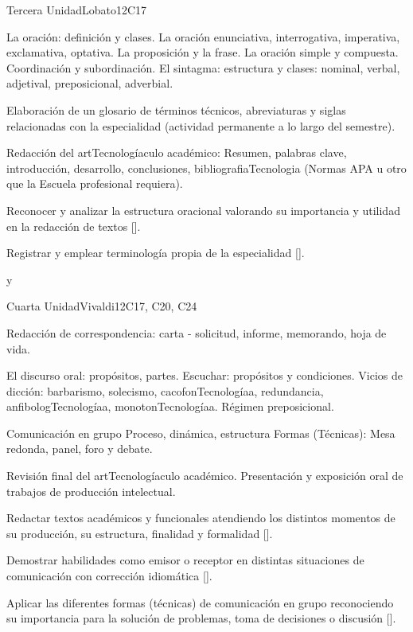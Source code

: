 \begin{syllabus}
\begin{unit}{}{Tercera Unidad}{Lobato}{12}{C17}
\begin{topics}
   \item La oración: definición y clases. La oración enunciativa, interrogativa, imperativa, exclamativa, optativa. La proposición y la frase. La oración simple y compuesta. Coordinación y subordinación. El sintagma: estructura y clases: nominal, verbal, adjetival, preposicional, adverbial.
   \item Elaboración de un glosario de términos técnicos, abreviaturas y siglas relacionadas con la especialidad (actividad permanente a lo largo del semestre).
   \item Redacción del artTecnologíaculo académico: Resumen, palabras clave, introducción, desarrollo, conclusiones, bibliografiaTecnologia (Normas APA u otro que la Escuela profesional requiera).
\end{topics}
\begin{learningoutcomes}
   \item Reconocer y analizar  la estructura oracional valorando su importancia y utilidad en la redacción de textos [\Usage].
   \item Registrar y emplear terminología propia de la especialidad [\Usage].
\end{learningoutcomes}
\end{unit}
y
\begin{unit}{}{Cuarta Unidad}{Vivaldi}{12}{C17, C20, C24}
\begin{topics}
   \item Redacción de correspondencia: carta - solicitud, informe, memorando, hoja de vida.
   \item El discurso oral: propósitos, partes. Escuchar: propósitos y condiciones. Vicios de dicción: barbarismo, solecismo, cacofonTecnologíaa, redundancia, anfibologTecnologíaa, monotonTecnologíaa. Régimen preposicional.
   \item Comunicación en grupo Proceso, dinámica, estructura Formas (Técnicas): Mesa redonda,  panel, foro y debate.
   \item Revisión final del artTecnologíaculo académico. Presentación y exposición oral de trabajos de producción intelectual.
\end{topics}
\begin{learningoutcomes}
   \item Redactar textos académicos y funcionales atendiendo los distintos momentos de su producción, su estructura, finalidad y formalidad [\Usage].
   \item Demostrar habilidades como emisor o receptor en distintas situaciones de comunicación con corrección idiomática [\Usage].
   \item Aplicar las diferentes formas (técnicas) de comunicación en grupo reconociendo su importancia para la solución de problemas, toma de decisiones o discusión [\Usage].
\end{learningoutcomes}
\end{unit}



\begin{coursebibliography}
\end{coursebibliography}

\end{syllabus}
